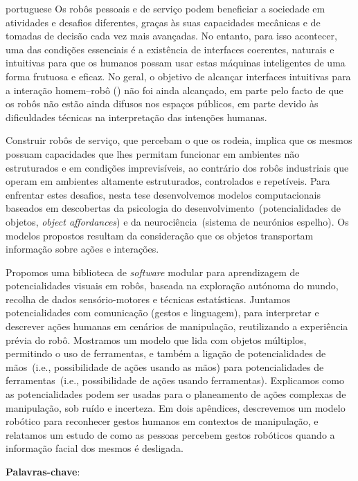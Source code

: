 
\begin{otherlanguage*}{portuguese}
Os robôs pessoais e de serviço podem beneficiar a sociedade em atividades e desafios diferentes, graças às suas capacidades mecânicas e de tomadas de decisão cada vez mais avançadas.
No entanto, para isso acontecer, uma das condições essenciais é a existência de interfaces coerentes, naturais e intuitivas para que os humanos possam usar estas máquinas inteligentes de uma forma frutuosa e eficaz.
No geral, o objetivo de alcançar interfaces intuitivas para a interação homem--robô (\emph{\hri}) não foi ainda alcançado, em parte pelo facto de que os robôs não estão ainda difusos nos espaços públicos, em parte devido às dificuldades técnicas na interpretação das intenções humanas.

Construir robôs de serviço, que percebam o que os rodeia, implica que os mesmos possuam capacidades que lhes permitam funcionar em ambientes não estruturados e em condições imprevisíveis, ao contrário dos robôs industriais que operam em ambientes altamente estruturados, controlados e repetíveis.
Para enfrentar estes desafios, nesta tese desenvolvemos modelos computacionais baseados em descobertas da psicologia do desenvolvimento~(potencialidades de objetos, \emph{object affordances}) e da neurociência~(sistema de neurónios espelho).
Os modelos propostos resultam da consideração que os objetos transportam informação sobre ações e interações.

Propomos uma biblioteca de \emph{software} modular para aprendizagem de potencialidades visuais em robôs, baseada na exploração autónoma do mundo, recolha de dados sensório-motores e técnicas estatísticas.
Juntamos potencialidades com comunicação (gestos e linguagem), para interpretar e descrever ações humanas em cenários de manipulação, reutilizando a experiência prévia do robô.
Mostramos um modelo que lida com objetos múltiplos, permitindo o uso de ferramentas, e também a ligação de potencialidades de mãos~(i.e., possibilidade de ações usando as mãos) para potencialidades de ferramentas~(i.e., possibilidade de ações usando ferramentas).
Explicamos como as potencialidades podem ser usadas para o planeamento de ações complexas de manipulação, sob ruído e incerteza.
Em dois apêndices,
descrevemos um modelo robótico para reconhecer gestos humanos em contextos de manipulação,
e relatamos um estudo de como as pessoas percebem gestos robóticos quando a informação facial dos mesmos é desligada.

\bigskip

\textbf{Palavras-chave}: \myPortugueseThesisKeywords
\end{otherlanguage*}
